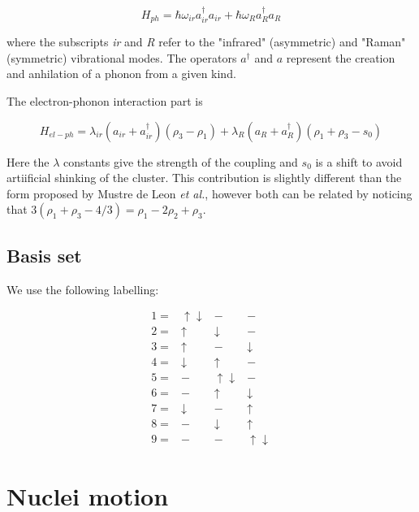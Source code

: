 \begin{equation}\label{phononic-part}H_{ph} = \hbar \omega_{ir}a_{ir}^\dagger a_{ir} + \hbar \omega_R a_R^\dagger a_R\end{equation}

where the subscripts \textit{ir} and \textit{R} refer to the "infrared" (asymmetric) and "Raman" (symmetric) vibrational modes. The operators $a^\dagger$ and $a$ represent the creation and anhilation of a phonon from a given kind.

The electron-phonon interaction part is

\begin{equation}\label{electron-lattice-coupling-part}H_{el-ph} = \lambda_{ir}(a_{ir} + a_{ir}^\dagger)(\rho_3 - \rho_1) + \lambda_R (a_R + a_R^\dagger)(\rho_1 + \rho_3-s_0)\end{equation}

Here the $\lambda$ constants give the strength of the coupling and $s_0$ is a shift to avoid artiificial shinking of the cluster. This contribution is slightly different than the form proposed by Mustre de Leon \textit{et al.}\cite{MustredeLeon1992}, however both can be related by noticing that $3 (\rho_1+\rho_3-4/3)=\rho_1-2\rho_2+\rho_3$.

\subsection{Basis set}

We use the following labelling:

\begin{equation}\label{eq:basis-set}\begin{array}{cccc}  
1= & \uparrow \downarrow & - & - \\
2= & \uparrow & \downarrow & - \\
3= & \uparrow & - & \downarrow \\
4= & \downarrow & \uparrow & - \\
5= & - & \uparrow \downarrow & - \\
6= & - & \uparrow & \downarrow \\
7= & \downarrow & - & \uparrow \\
8= & - & \downarrow & \uparrow \\
9= & - & - & \uparrow \downarrow \end{array}\end{equation}

\section{Nuclei motion}

